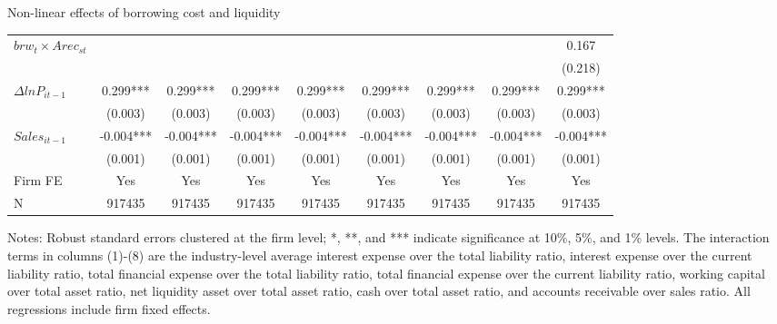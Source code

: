 \documentclass[10pt]{beamer}
\begin{document}
\begin{frame}{Non-linear effects of borrowing cost and liquidity}
\begin{table}[htbp]
{\begin{threeparttable}
\begin{tabular}{lcccccccc}
        $brw_t \times Arec_{st}$ &       &       &       &       &       &       &       & 0.167 \\
              &       &       &       &       &       &       &       & (0.218) \\
        $\Delta ln P_{it-1}$ & 0.299*** & 0.299*** & 0.299*** & 0.299*** & 0.299*** & 0.299*** & 0.299*** & 0.299*** \\
              & (0.003) & (0.003) & (0.003) & (0.003) & (0.003) & (0.003) & (0.003) & (0.003) \\
        $Sales_{it-1}$ & -0.004*** & -0.004*** & -0.004*** & -0.004*** & -0.004*** & -0.004*** & -0.004*** & -0.004*** \\
              & (0.001) & (0.001) & (0.001) & (0.001) & (0.001) & (0.001) & (0.001) & (0.001) \\
        \midrule
        Firm FE & Yes   & Yes   & Yes   & Yes   & Yes   & Yes   & Yes   & Yes \\
        N     & 917435 & 917435 & 917435 & 917435 & 917435 & 917435 & 917435 & 917435 \\
            \bottomrule
        \end{tabular}
            \begin{tablenotes}
                \footnotesize
                \item Notes: Robust standard errors clustered at the firm level;  *, **, and *** indicate significance at 10\%, 5\%, and 1\% levels. The interaction terms in columns (1)-(8) are the industry-level average interest expense over the total liability ratio, interest expense over the current liability ratio, total financial expense over the total liability ratio, total financial expense over the current liability ratio, working capital over total asset ratio, net liquidity asset over total asset ratio, cash over total asset ratio, and accounts receivable over sales ratio. All regressions include firm fixed effects.
    	\end{tablenotes}
        \end{threeparttable}
        }
        \label{tab.non-linearity}
    \end{table}    
\end{frame}
\end{document}

